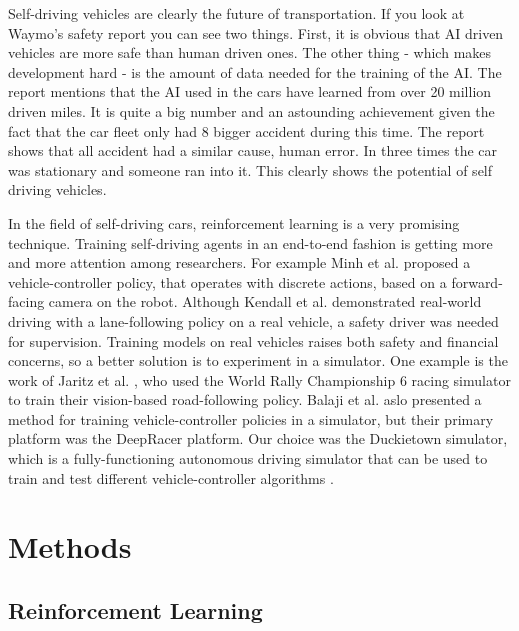\documentclass{article}
\begin{document}
Self-driving vehicles are clearly the future of transportation. If you look at Waymo's \cite{waymo}  safety report you can see two things. First, it is obvious that AI driven vehicles are more safe than human driven ones. The other thing - which makes development hard - is the amount of data needed for the training of the AI. 
The report mentions that the AI used in the cars have learned from over 20 million driven miles. It is quite a big number and an astounding achievement given the fact that the car fleet only had 8 bigger accident during this time. The report shows that all accident had a similar cause, human error. In three times the car was stationary and someone ran into it. This clearly shows the potential of self driving vehicles.

In the field of self-driving cars, reinforcement learning is a very promising technique. Training self-driving agents in an end-to-end fashion is getting more and more attention among researchers. For example Minh et al. \cite{DBLP:journals/corr/MnihBMGLHSK16} proposed a vehicle-controller policy, that operates with discrete actions, based on a forward-facing camera on the robot. Although Kendall et al. \cite{kendall2018learning} demonstrated real-world driving with a lane-following policy on a real vehicle, a safety driver was needed for supervision. 
Training models on real vehicles raises both safety and financial concerns, so a better solution is to experiment in a simulator. One example is the work of Jaritz et al. \cite{DBLP:journals/corr/abs-1807-02371}, who used the World Rally Championship 6 racing simulator to train their vision-based road-following policy. Balaji et al. \cite{DBLP:journals/corr/abs-1911-01562} aslo presented a method for training vehicle-controller policies in a simulator, but their primary platform was the DeepRacer platform. Our choice was the Duckietown simulator, which is a fully-functioning autonomous driving simulator that can be used to train and test different vehicle-controller algorithms \cite{gymdt}.

\section{\large{Methods}}

\subsection{\normalsize{Reinforcement Learning}}
\end{document}
